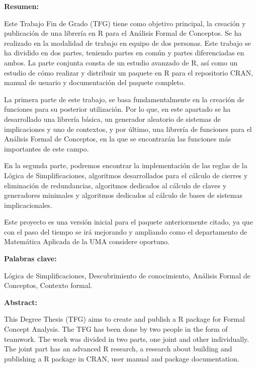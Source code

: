 \setcounter{page}{5}
{

\textbf{Resumen:}

Este Trabajo Fin de Grado (TFG) tiene como objetivo principal, la creaci\'on y publicaci\'on de una librer\'ia 
en R para el An\'alisis Formal de Conceptos. Se ha realizado en la modalidad de trabajo en equipo de dos personas. 
Este trabajo se ha dividido en dos partes, teniendo partes en com\'un y partes diferenciadas en ambos. La parte conjunta 
consta de un estudio avanzado de R, as\'i como un estudio de c\'omo realizar y distribuir un paquete en R para el repositorio 
CRAN, manual de usuario y documentaci\'on del paquete completo.

La primera parte de este trabajo, se basa fundamentalmente en la creaci\'on de funciones para su posterior utilizaci\'on. Por lo que, 
en este apartado se ha desarrollado una librer\'ia b\'asica, un generador aleatorio de sistemas de implicaciones y uno de contextos, y 
por \'ultimo, una librer\'ia de funciones para el An\'alisis Formal de Conceptos, en la que se encontrar\'an las funciones m\'as importantes 
de este campo.

En la segunda parte, podremos encontrar la implementaci\'on de las reglas de la L\'ogica de Simplificaciones, algoritmos desarrollados para 
el c\'alculo de cierres y eliminaci\'on de redundancias, algoritmos dedicados al c\'alculo de claves y generadores minimales y
algoritmos dedicados al c\'alculo de bases de sistemas implicacionales.

Este proyecto es una versi\'on inicial para el paquete anteriormente citado, ya que con el paso del tiempo se ir\'a mejorando y ampliando como 
el departamento de Matem\'atica Aplicada de la UMA considere oportuno.



\bigskip

\textbf{Palabras clave:}

L\'ogica de Simplificaciones, Descubrimiento de conocimiento, 
An\'alisis Formal de Conceptos, Contexto formal.

\clearpage

\textbf{Abstract:}

This Degree Thesis (TFG) aims to create and publish a R package for Formal Concept Analysis. The TFG has been done by two people in the 
form of teamwork. The work was divided in two parts, one joint and other individually. The joint part has an advanced R research, 
a research about building and publishing a R package in CRAN, user manual and package documentation. 

}

